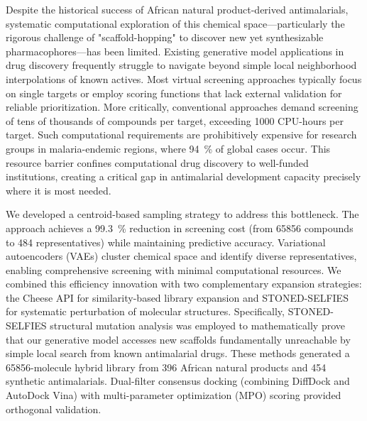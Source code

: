 \documentclass[journal=jcisd8,manuscript=article]{achemso}
\begin{document}
Despite the historical success of African natural product-derived antimalarials, systematic computational exploration of this chemical space—particularly the rigorous challenge of "scaffold-hopping" to discover new yet synthesizable pharmacophores—has been limited. Existing generative model applications in drug discovery frequently struggle to navigate beyond simple local neighborhood interpolations of known actives. Most virtual screening approaches typically focus on single targets or employ scoring functions that lack external validation for reliable prioritization. More critically, conventional approaches demand screening of tens of thousands of compounds per target, exceeding \num{1000} CPU-hours per target. Such computational requirements are prohibitively expensive for research groups in malaria-endemic regions, where \qty{94}{\percent} of global cases occur. This resource barrier confines computational drug discovery to well-funded institutions, creating a critical gap in antimalarial development capacity precisely where it is most needed.

We developed a centroid-based sampling strategy to address this bottleneck. The approach achieves a \qty{99.3}{\percent} reduction in screening cost (from \num{65856} compounds to \num{484} representatives) while maintaining predictive accuracy. Variational autoencoders (VAEs) cluster chemical space and identify diverse representatives, enabling comprehensive screening with minimal computational resources. We combined this efficiency innovation with two complementary expansion strategies: the Cheese API \cite{lzicar_cheese_2024} for similarity-based library expansion and STONED-SELFIES \cite{Krenn2020} for systematic perturbation of molecular structures. Specifically, STONED-SELFIES structural mutation analysis was employed to mathematically prove that our generative model accesses new scaffolds fundamentally unreachable by simple local search from known antimalarial drugs. These methods generated a \num{65856}-molecule hybrid library from \num{396} African natural products and \num{454} synthetic antimalarials. Dual-filter consensus docking (combining DiffDock and AutoDock Vina) with multi-parameter optimization (MPO) scoring provided orthogonal validation.
\end{document}
